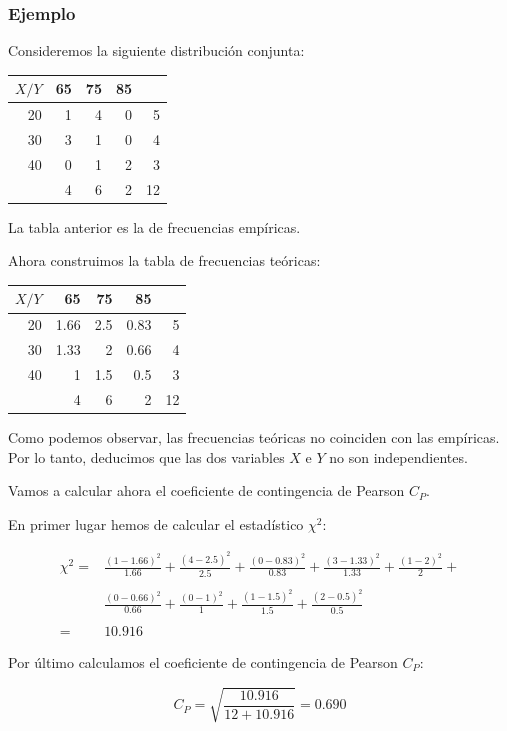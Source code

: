 \begin{frame}
\frametitle{Ejemplo}
Consideremos la siguiente distribución conjunta:

\begin{center}
\begin{tabular}{r|rrr|r}
$X/Y$ & 65 & 75 & 85 & \\ \hline 20 & 1 & 4 & 0 & 5 \\ 30 & 3 & 1 & 0 & 4 \\ 40 & 0 & 1 &
2 & 3 \\ \hline & 4 & 6 & 2 & 12
\end{tabular}
\end{center}

La tabla anterior es la de frecuencias empíricas.
\end{frame}

\begin{frame}
 Ahora construimos la tabla de
frecuencias teóricas:

\begin{center}
\begin{tabular}{r|rrr|r}
$X/Y$ & 65 & 75 & 85 & \\ \hline 20 & 1.66 & 2.5 & 0.83 & 5 \\ 30 & 1.33 & 2 & 0.66 & 4
\\ 40 & 1 & 1.5 & 0.5 & 3 \\ \hline & 4 & 6 & 2 & 12
\end{tabular}
\end{center}
\end{frame}

\begin{frame}
Como podemos observar, las frecuencias teóricas no coinciden con  las  empíricas. Por lo tanto, deducimos  que las
dos variables $X$ e $Y$ no son independientes.

Vamos a calcular ahora el  coeficiente de contingencia de Pearson $C_P$.

En primer lugar hemos de calcular el estadístico $\chi^2$:

$$\begin{array}{rl}
\chi^2= & \frac{\left(1-1.66\right)^2}{1.66} +\frac{\left(4-2.5\right)^2}{2.5}+
\frac{\left(0-0.83\right)^2}{0.83}+ \frac{\left(3-1.33\right)^2}{1.33}
+\frac{\left(1-2\right)^2}{2}+ \\ & \\ & \frac{\left(0-0.66\right)^2}{0.66}+
\frac{\left(0-1\right)^2}{1} +\frac{\left(1-1.5\right)^2}{1.5}+
\frac{\left(2-0.5\right)^2}{0.5} \\ & \\ = & 10.916
\end{array}
$$

 Por último calculamos el coeficiente de contingencia  de Pearson $C_P$:

$$C_P=\sqrt{\frac{10.916}{12+10.916}}=0.690$$
\end{frame}

